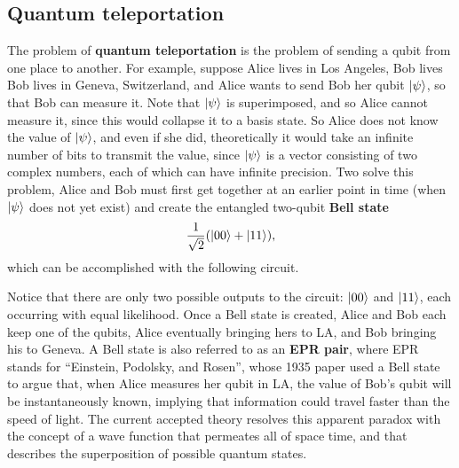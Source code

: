 \documentclass [12pt]{article}
\theoremstyle{definition}
\begin{document}
\newpage
\subsection*{Quantum teleportation}

The problem of \textbf{quantum teleportation} is the problem of sending a qubit from one place to another. For example, suppose Alice lives in Los Angeles, Bob lives
Bob lives in Geneva, Switzerland, and Alice wants to send Bob her qubit $\ket{\psi}$, so that Bob can measure it. Note that $\ket{\psi}$ is superimposed, and so Alice cannot measure
it, since this would collapse it to a basis state. So Alice does not know the value of $\ket{\psi}$, and even if she did, theoretically it would take an infinite number of bits
to transmit the value, since $\ket{\psi}$ is a vector consisting of two complex numbers, each of which can have infinite precision. Two solve this problem, Alice and Bob must 
first get together at an earlier point in time (when $\ket{\psi}$ does not yet exist) and create the entangled two-qubit \textbf{Bell state} 
\[\frac{1}{\sqrt{2}}(\ket{00} + \ket{11}),\]
which can be accomplished with the following circuit.


\begin{center}
\end{center}

Notice that there are only two possible outputs to the circuit: $\ket{00}$ and $\ket{11}$, each occurring with equal likelihood. Once a Bell state is created, Alice and Bob each keep
one of the qubits, Alice eventually bringing hers to LA, and Bob bringing his to Geneva. A Bell state is also referred to as an \textbf{EPR pair}, where EPR stands for ``Einstein,
Podolsky, and Rosen'', whose 1935 paper used a Bell state to argue that, when Alice measures her qubit in LA, the value of Bob's qubit will be instantaneously known, implying that
information could travel faster than the speed of light. The current accepted theory resolves this apparent  paradox with the concept 
of a wave function that permeates all of space time, and that describes the superposition of possible quantum states.
\end{document}

